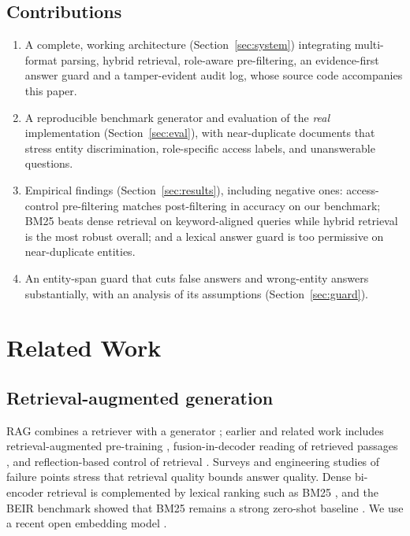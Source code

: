 \documentclass[journal]{IEEEtran}
\begin{document}
\subsection*{Contributions}
\begin{enumerate}
\item A complete, working architecture (Section~\ref{sec:system}) integrating multi-format parsing, hybrid retrieval, role-aware pre-filtering, an evidence-first answer guard and a tamper-evident audit log, whose source code accompanies this paper.
\item A reproducible benchmark generator and evaluation of the \emph{real} implementation (Section~\ref{sec:eval}), with near-duplicate documents that stress entity discrimination, role-specific access labels, and unanswerable questions.
\item Empirical findings (Section~\ref{sec:results}), including negative ones: access-control pre-filtering matches post-filtering in accuracy on our benchmark; BM25 beats dense retrieval on keyword-aligned queries while hybrid retrieval is the most robust overall; and a lexical answer guard is too permissive on near-duplicate entities.
\item An entity-span guard that cuts false answers and wrong-entity answers substantially, with an analysis of its assumptions (Section~\ref{sec:guard}).
\end{enumerate}

\section{Related Work}
\subsection{Retrieval-augmented generation}
RAG combines a retriever with a generator \cite{lewis2020rag}; earlier and related work includes retrieval-augmented pre-training \cite{guu2020realm}, fusion-in-decoder reading of retrieved passages \cite{izacard2021fid}, and reflection-based control of retrieval \cite{asai2023selfrag}. Surveys \cite{gao2023ragsurvey} and engineering studies of failure points \cite{barnett2024failure} stress that retrieval quality bounds answer quality. Dense bi-encoder retrieval \cite{karpukhin2020dpr,reimers2019sbert} is complemented by lexical ranking such as BM25 \cite{robertson2009bm25}, and the BEIR benchmark showed that BM25 remains a strong zero-shot baseline \cite{thakur2021beir}. We use a recent open embedding model \cite{xiao2023cpack}.
\end{document}
